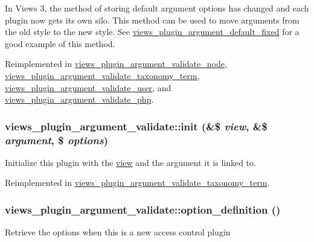 In Views 3, the method of storing default argument options has changed and each plugin now gets its own silo. This method can be used to move arguments from the old style to the new style. See \hyperlink{classviews__plugin__argument__default__fixed}{views\_\-plugin\_\-argument\_\-default\_\-fixed} for a good example of this method. 

Reimplemented in \hyperlink{classviews__plugin__argument__validate__node_ac22f025079c1bd85bae75c522142e779}{views\_\-plugin\_\-argument\_\-validate\_\-node}, \hyperlink{classviews__plugin__argument__validate__taxonomy__term_aa4bbbfd0ccb6a907f7fa3d2c03d504c6}{views\_\-plugin\_\-argument\_\-validate\_\-taxonomy\_\-term}, \hyperlink{classviews__plugin__argument__validate__user_a0e9153f6d0cfcd5f28854731d89cce0e}{views\_\-plugin\_\-argument\_\-validate\_\-user}, and \hyperlink{classviews__plugin__argument__validate__php_a8e9620b1e226ad96a2796a313583bafe}{views\_\-plugin\_\-argument\_\-validate\_\-php}.\hypertarget{classviews__plugin__argument__validate_a36d63524ce3cc1af5fd8b1e0d56e61ad}{
\subsubsection[{init}]{\setlength{\rightskip}{0pt plus 5cm}views\_\-plugin\_\-argument\_\-validate::init (\&\$ {\em view}, \/  \&\$ {\em argument}, \/  \$ {\em options})}}
\label{classviews__plugin__argument__validate_a36d63524ce3cc1af5fd8b1e0d56e61ad}
Initialize this plugin with the \hyperlink{classview}{view} and the argument it is linked to. 

Reimplemented in \hyperlink{classviews__plugin__argument__validate__taxonomy__term_af215aeb235ee101b78ceca11f879308d}{views\_\-plugin\_\-argument\_\-validate\_\-taxonomy\_\-term}.\hypertarget{classviews__plugin__argument__validate_aebc7a373a95a76ecb64345f558453b2d}{
\subsubsection[{option\_\-definition}]{\setlength{\rightskip}{0pt plus 5cm}views\_\-plugin\_\-argument\_\-validate::option\_\-definition ()}}
\label{classviews__plugin__argument__validate_aebc7a373a95a76ecb64345f558453b2d}
Retrieve the options when this is a new access control plugin 

